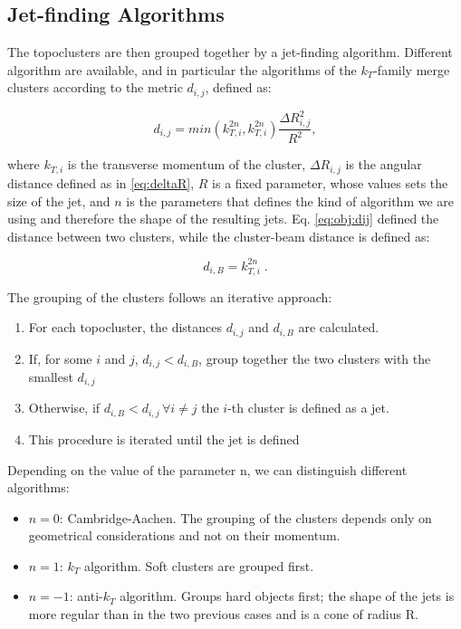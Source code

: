 \subsection{Jet-finding Algorithms}
\label{sec:obj:jetfinding}

The topoclusters are then grouped together by a jet-finding algorithm. Different algorithm are available, and in particular the algorithms of the $k_T$-family merge clusters according to the metric $d_{i,j}$, defined as:

\begin{equation}
d_{i,j} = min\left( k_{T,i}^{2n}, k_{T,i}^{2n}  \right) \frac{\Delta R_{i,j}^2}{R^2},
\label{eq:obj:dij}
\end{equation}

where $k_{T,i}$ is the transverse momentum of the cluster, $\Delta R_{i,j}$ is the angular distance defined as in \ref{eq:deltaR}, $R$ is a fixed parameter, whose values sets the size of the jet, and $n$ is the parameters that defines the kind of algorithm we are using and therefore the shape of the resulting jets. Eq. \ref{eq:obj:dij} defined the distance between two clusters, while the cluster-beam distance is defined as:

\begin{equation}
d_{i,B} =  k_{T,i}^{2n} \; .
\end{equation}

The grouping of the clusters follows an iterative approach:
\begin{enumerate}
\item For each topocluster, the distances $d_{i,j}$ and $d_{i,B}$ are calculated.
\item If, for some $i$ and $j$, $d_{i,j} < d_{i,B}$, group together the two clusters with the smallest $d_{i,j}$
\item Otherwise, if $d_{i,B} < d_{i,j} \, \forall i \neq j $ the $i$-th cluster is defined as a jet.
\item This procedure is iterated until the jet is defined
\end{enumerate}

Depending on the value of the parameter n, we can distinguish different algorithms:
\begin{itemize}
\item $n=0$: Cambridge-Aachen. The grouping of the clusters depends only on geometrical considerations and not on their momentum. 
\item $n=1$: $k_T$ algorithm. Soft clusters are grouped first.
\item $n=-1$: anti-$k_T$ algorithm. Groups hard objects first; the shape of the jets is more regular than in the two previous cases and is a cone of radius R.
\end{itemize}

